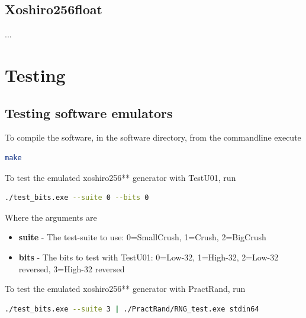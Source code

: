 \documentclass{article}
\begin{document}
\subsection{Xoshiro256float}

...

\section{Testing}

\subsection{Testing software emulators}

To compile the software, in the software directory, from the commandline execute

\begin{minipage}{1.0\textwidth}
\centering
\begin{lstlisting}[language=bash , label=lst:Make]
make
\end{lstlisting}
\end{minipage}

To test the emulated xoshiro256** generator with TestU01, run

\begin{minipage}{1.0\textwidth}
\centering
\begin{lstlisting}[language=bash, label=lst:SwTestU01]
./test_bits.exe --suite 0 --bits 0 
\end{lstlisting}
\end{minipage}

Where the arguments are

\begin{itemize}
\item \textbf{suite} - The test-suite to use: 0=SmallCrush, 1=Crush, 2=BigCrush 
\item \textbf{bits} - The bits to test with TestU01: 0=Low-32, 1=High-32, 2=Low-32 reversed, 3=High-32 reversed
\end{itemize}

To test the emulated xoshiro256** generator with PractRand, run

\begin{minipage}{1.0\textwidth}
\centering
\begin{lstlisting}[language=bash, label=lst:SwPractRand]
./test_bits.exe --suite 3 | ./PractRand/RNG_test.exe stdin64 
\end{lstlisting}
\end{minipage}
\end{document}
